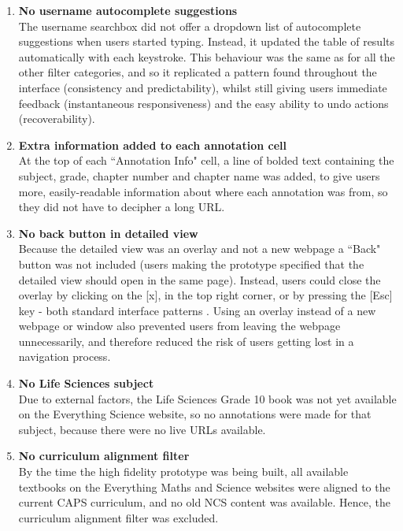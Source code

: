 \begin{enumerate}
\item \textbf{No username autocomplete suggestions}\\
The username searchbox did not offer a dropdown list of autocomplete suggestions when users started typing. Instead, it updated the table of results automatically with each keystroke. This behaviour was the same as for all the other filter categories, and so it replicated a pattern found throughout the interface (consistency and predictability), whilst still giving users immediate feedback (instantaneous responsiveness) and the easy ability to undo actions (recoverability)\citep[p. 272]{DixFinlay}. 

\item \textbf{Extra information added to each annotation cell}\\
At the top of each ``Annotation Info" cell, a line of bolded text containing the subject, grade, chapter number and chapter name was added, to give users more, easily-readable information about where each annotation was from, so they did not have to decipher a long URL.

\item \textbf{No back button in detailed view}\\
Because the detailed view was an overlay and not a new webpage a ``Back" button was not included (users making the prototype specified that the detailed view should open in the same page). Instead, users could close the overlay by clicking on the [x], in the top right corner, or by pressing the [Esc] key - both standard interface patterns \citep[p. 345]{Galitz}. Using an overlay instead of a new webpage or window also prevented users from leaving the webpage unnecessarily, and therefore reduced the risk of users getting lost in a navigation process. 

\item \textbf{No Life Sciences subject}\\
Due to external factors, the Life Sciences Grade 10 book was not yet available on the Everything Science website, so no annotations were made for that subject, because there were no live URLs available. 

\item \textbf{No curriculum alignment filter}\\
By the time the high fidelity prototype was being built, all available textbooks on the Everything Maths and Science websites were aligned to the current CAPS curriculum, and no old NCS content was available. Hence, the curriculum alignment filter was excluded. 


\end{enumerate}

